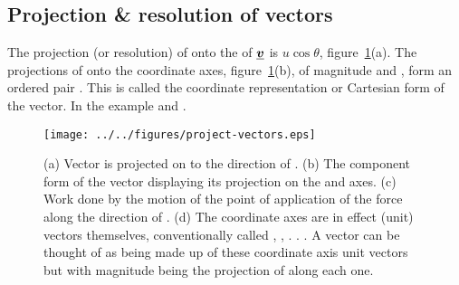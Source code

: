 



\addtolength{\topmargin}{-0.7 cm}
\setlength{\columnsep}{22pt}


\subsection*{Projection \& resolution of vectors}
The projection (or resolution) of  onto the  of $\mathit{\underline{\boldsymbol{v}}}$ is $u \cos\theta$, figure~\ref{fig:project-vectors}(a). The projections of   onto the coordinate axes, figure~\ref{fig:project-vectors}(b), of magnitude  and , form an ordered pair .  This is called the coordinate representation or Cartesian form of the vector.  In the example  and .
\begin{figure}[h!]
\centering
\texttt{[image: ../../figures/project-vectors.eps]}
\caption{(a) Vector  is projected on to the direction of .  (b) The component form of the vector  displaying its projection on the  and  axes. (c) Work done by the motion of the point of application of the force  along the direction of . (d) The coordinate axes are in effect (unit) vectors themselves, conventionally called , , . . . A vector  can be thought of as being made up of these coordinate axis unit vectors but with magnitude being the projection of  along each one. }\label{fig:project-vectors}
\end{figure}
\vspace{-0.5cm}
